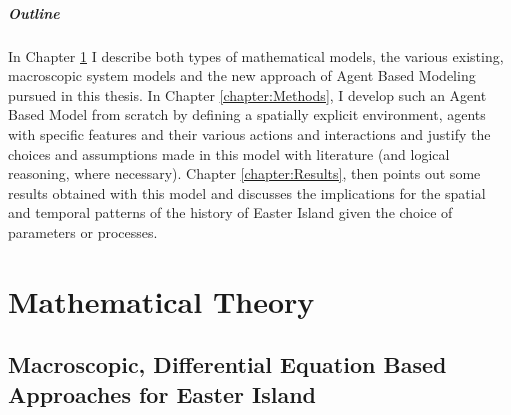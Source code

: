 \paragraph{Outline}
In Chapter \ref{chapter:Theory} I describe both types of mathematical models, the various existing, macroscopic system models and the new approach of Agent Based Modeling pursued in this thesis.
In Chapter \ref{chapter:Methods}, I develop such an Agent Based Model from scratch by defining a spatially explicit environment, agents with specific features and their various actions and interactions and justify the choices and assumptions made in this model with literature (and logical reasoning, where necessary).
Chapter \ref{chapter:Results}, then points out some results obtained with this model and discusses the implications for the spatial and temporal patterns of the history of Easter Island given the choice of parameters or processes.

\chapter{Mathematical Theory}\label{chapter:Theory}
\FloatBarrier
\section{Macroscopic, Differential Equation Based Approaches for Easter Island}

